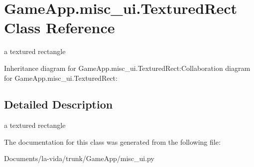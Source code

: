 \hypertarget{classGameApp_1_1misc__ui_1_1TexturedRect}{
\section{GameApp.misc\_\-ui.TexturedRect Class Reference}
\label{classGameApp_1_1misc__ui_1_1TexturedRect}
}
a textured rectangle  


Inheritance diagram for GameApp.misc\_\-ui.TexturedRect:Collaboration diagram for GameApp.misc\_\-ui.TexturedRect:

\subsection{Detailed Description}
a textured rectangle 

The documentation for this class was generated from the following file:\begin{CompactItemize}
\item 
Documents/la-vida/trunk/GameApp/misc\_\-ui.py\end{CompactItemize}
